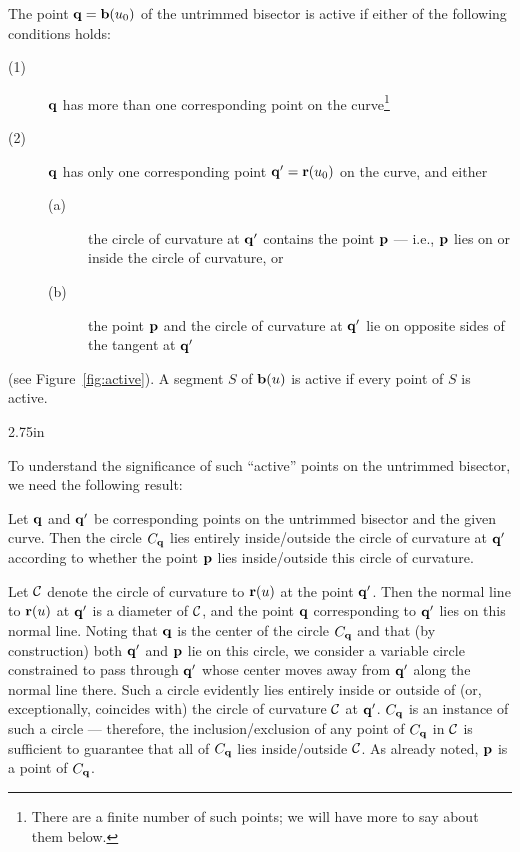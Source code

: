 \begin{dfn}
The point ${\bf q} = {\bf b}(u_{0})$ of the untrimmed bisector is
{\rm active} if either of the following conditions holds:
\begin{description}
\item[{\rm (1)}]
        ${\bf q}$ has more than one corresponding point on the
        curve\footnote{There are a finite number of such points;
        we will have more to say about them below.}
\item[{\rm (2)}]
        ${\bf q}$ has only one corresponding point ${\bf q}' =
        {\bf r}(u_0)$ on the curve, and either
\begin{description}
\item[{\rm (a)}]
        the circle of curvature at ${\bf q}'$ contains the point ${\bf p}$
        --- i.e., ${\bf p}$ lies on or inside the circle of curvature, or
\item[{\rm (b)}]
        the point ${\bf p}$ and the circle of curvature at ${\bf q}'$
        lie on opposite sides of the tangent at ${\bf q'}$
\end{description}
\end{description}
(see Figure~\ref{fig:active}). A segment $S$ of ${\bf b}(u)$ is active
if every point of $S$ is active.
\end{dfn}

{2.75in}

To understand the significance of such ``active'' points on the untrimmed
bisector, we need the following result:

\begin{lma} \label{lma:circles}
Let ${\bf q}$ and ${\bf q}'$ be corresponding points on the untrimmed
bisector and the given curve. Then the circle $C_{\bf q}$ lies entirely
inside/outside the circle of curvature at ${\bf q}'$ according to whether
the point ${\bf p}$ lies inside/outside this circle of curvature.
\end{lma}
\prf
Let ${\cal C}$ denote the circle of curvature to ${\bf r}(u)$ at the
point ${\bf q}'$. Then the normal line to ${\bf r}(u)$ at ${\bf q}'$
is a diameter of ${\cal C}$, and the point ${\bf q}$ corresponding
to ${\bf q}'$ lies on this normal line. Noting that ${\bf q}$ is
the center of the circle $C_{\bf q}$ and that (by construction) both
${\bf q}'$ and ${\bf p}$ lie on this circle, we consider a variable
circle constrained to pass through ${\bf q}'$ whose center moves away
from ${\bf q}'$ along the normal line there. Such a circle evidently
lies entirely inside or outside of (or, exceptionally, coincides with)
the circle of curvature ${\cal C}$ at ${\bf q}'$. $C_{\bf q}$ is an
instance of such a circle --- therefore, the inclusion/exclusion of
any point of $C_{\bf q}$ in ${\cal C}$ is sufficient to guarantee that
all of $C_{\bf q}$ lies inside/outside ${\cal C}$. As already noted,
${\bf p}$ is a point of $C_{\bf q}$.
\QED

